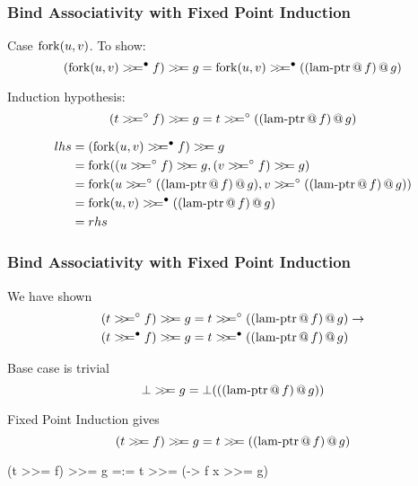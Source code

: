 \documentclass[serif,professionalfont]{beamer}
\begin{document}
\begin{frame}[fragile]
\frametitle{Bind Associativity with Fixed Point Induction}

Case $\mathrm{fork}(u,v)$. To show:
$$\bind{(\bindb{\fork{u}{v}}{f})}{g} = \bindb{\fork{u}{v}}{\lamptr{f}{g}}$$

Induction hypothesis:
$$\bind{(\bindw{t}{f})}{g} = \bindw{t}{\lamptr{f}{g}}$$


\begin{align*}
lhs = & \; \bind{(\bindb{\fork{u}{v}}{f})}{g} \\
    = & \; \fork{\bind{(\bindw{u}{f})}{g}}{\bind{(\bindw{v}{f})}{g}}\\
    = & \; \fork{\bindw{u}{\lamptr{f}{g}}}{\bindw{v}{\lamptr{f}{g}}} \\
    = & \; \bindb{\fork{u}{v}}{\lamptr{f}{g}} \\
    = & \; rhs
\end{align*}

\end{frame}

%
%
%

\begin{frame}[fragile]
\frametitle{Bind Associativity with Fixed Point Induction}

We have shown
\begin{align*}
&\bind{(\bindw{t}{f})}{g} = \bindw{t}{\lamptr{f}{g}} \rightarrow \\
&\bind{(\bindb{t}{f})}{g} = \bindb{t}{\lamptr{f}{g}}
\end{align*}

Base case is trivial
$$\bot >\!\!>\!\!= g = \bot(((\mathrm{\operatorname{lam-ptr}} \, @ \, f) \, @ \, g))$$

Fixed Point Induction gives
$$\bind{(\bind{t}{f})}{g} = \bind{t}{\lamptr{f}{g}}$$

\begin{code}
(t >>= f) >>= g =:= t >>= (\x -> f x >>= g)
\end{code}

\end{frame}
\end{document}
